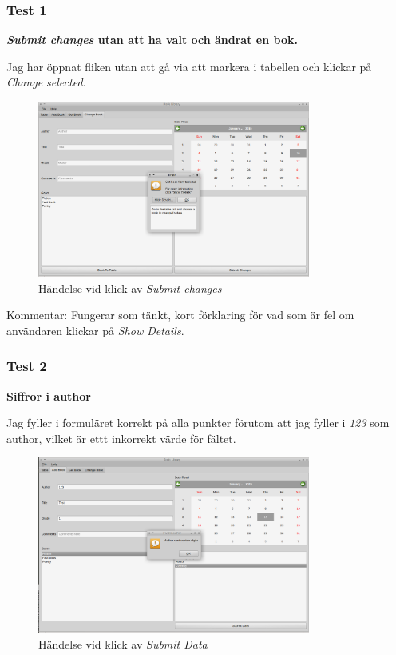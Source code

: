 \documentclass[11pt, titlepage, oneside, a4paper]{article}
\begin{document}
        \subsubsection{Test 1}
        \textbf{\emph{Submit changes} utan att ha valt och ändrat en bok.}
        
        Jag har öppnat fliken utan att gå via att markera i tabellen och klickar på \emph{Change selected}.
        \begin{figure}[h!]
        \includegraphics[width=0.8\textwidth]{test_1}
        \caption{Händelse vid klick av \emph{Submit changes}}
        \label{fig:start}
        \end{figure}
        
        Kommentar: Fungerar som tänkt, kort förklaring för vad som är fel  om användaren klickar på \emph{Show Details}.
        
        \subsubsection{Test 2}
        \textbf{Siffror i author}
        
        Jag fyller i formuläret korrekt på alla punkter förutom att jag fyller i \emph{123} som author, vilket är ettt inkorrekt värde för fältet.
        
        \begin{figure}[h!]
        \includegraphics[width=0.8\textwidth]{test_2}
        \caption{Händelse vid klick av \emph{Submit Data}}
        \label{fig:start}
        \end{figure}
        
\end{document}
